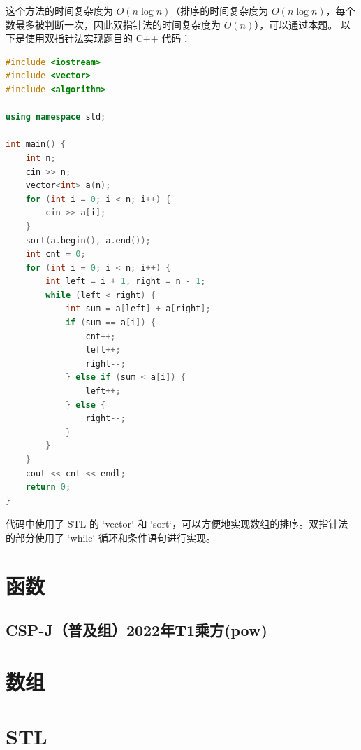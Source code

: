 \documentclass[12pt,twiside,a4paper]{ctexbook}
\numberwithin{chapter}{part}
\begin{document}
这个方法的时间复杂度为 $O(n \log n)$（排序的时间复杂度为 $O(n \log n)$，每个数最多被判断一次，因此双指针法的时间复杂度为 $O(n)$），可以通过本题。
以下是使用双指针法实现题目的 C++ 代码：
\begin{lstlisting}[language=C++]
#include <iostream>
#include <vector>
#include <algorithm>

using namespace std;

int main() {
    int n;
    cin >> n;
    vector<int> a(n);
    for (int i = 0; i < n; i++) {
        cin >> a[i];
    }
    sort(a.begin(), a.end());
    int cnt = 0;
    for (int i = 0; i < n; i++) {
        int left = i + 1, right = n - 1;
        while (left < right) {
            int sum = a[left] + a[right];
            if (sum == a[i]) {
                cnt++;
                left++;
                right--;
            } else if (sum < a[i]) {
                left++;
            } else {
                right--;
            }
        }
    }
    cout << cnt << endl;
    return 0;
}
\end{lstlisting}
代码中使用了 STL 的 `vector` 和 `sort`，可以方便地实现数组的排序。双指针法的部分使用了 `while` 循环和条件语句进行实现。

\chapter{函数}
\section{CSP-J（普及组）2022年T1乘方(pow)}

\chapter{数组}

\chapter{STL}

\clearpage
\end{document}
